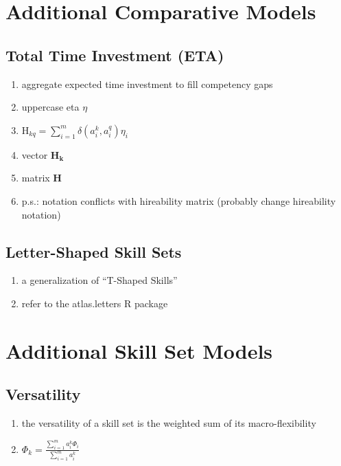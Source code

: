 \documentclass{elsarticle} %
\begin{document}

\section{Additional Comparative Models}
\subsection{Total Time Investment (ETA)}
\begin{enumerate}
    \item aggregate expected time investment to fill competency gaps
    \item uppercase eta $\eta$
    \item $\text{H}_{kq} = \sum_{i=1}^{m}{
              \delta(a_{i}^{k}, a_{i}^{q})
              \eta_i
              }$
    \item vector $\textbf{H}\boldsymbol{_k}$
    \item matrix $\textbf{H}$
    \item p.s.: notation conflicts with hireability matrix (probably change hireability
          notation)
\end{enumerate}

\subsection{Letter-Shaped Skill Sets}
\begin{enumerate}
    \item a generalization of ``T-Shaped Skills''
    \item refer to the atlas.letters R package
\end{enumerate}


\section{Additional Skill Set Models}
\subsection{Versatility}
\begin{enumerate}
    \item the versatility of a skill set is the weighted sum of its macro-flexibility
    \item $\Phi_k = \frac{ \sum_{i=1}^{m}{a_{i}^{k} \Phi_i} }{
              \sum_{i=1}^{m}{a_{i}^{k}} }$
\end{enumerate}
\end{document}
